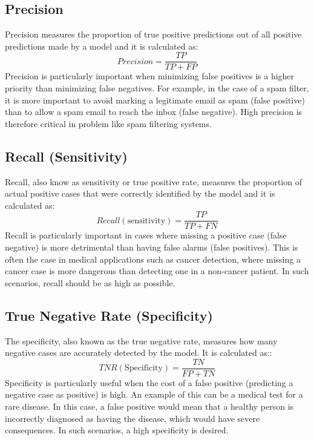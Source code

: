 \subsection{Precision}
Precision measures the proportion of true positive predictions out of all positive predictions made by a model and it is calculated as:
\begin{equation}\label{eqn_prec}
  Precision = \frac{TP}{TP+FP}
\end{equation}Precision is particularly important when minimizing false positives is a higher priority than minimizing false negatives. For example, in the case of a spam filter, it is more important to avoid marking a legitimate email as spam (false positive) than to allow a spam email to reach the inbox (false negative). High precision is therefore critical in problem like spam filtering systems.

\subsection{Recall (Sensitivity)}
Recall, also know as sensitivity or true positive rate, measures the proportion of actual positive cases that were correctly identified by the model and it is calculated as:
\begin{equation}\label{eqn_recall}
  Recall (\text{sensitivity}) = \frac{TP}{TP+FN}
\end{equation}Recall is particularly important in cases where missing a positive case (false negative) is more detrimental than having false alarms (false positives). This is often the case in medical applications such as cancer detection, where missing a cancer case is more dangerous than detecting one in a non-cancer patient. In such scenarios, recall should be as high as possible.

\subsection{True Negative Rate (Specificity)}
The specificity, also known as the true negative rate, measures how many negative cases are accurately detected by the model. It is calculated as::
\begin{equation}\label{eqn_specificity}
  TNR (\text{Specificity}) = \frac{TN}{FP+TN}
\end{equation} Specificity is particularly useful when the cost of a false positive (predicting a negative case as positive) is high. An example of this can be a medical test for a rare disease. In this case, a false positive would mean that a healthy person is incorrectly diagnosed as having the disease, which would have severe consequences. In such scenarios, a high specificity is desired.

